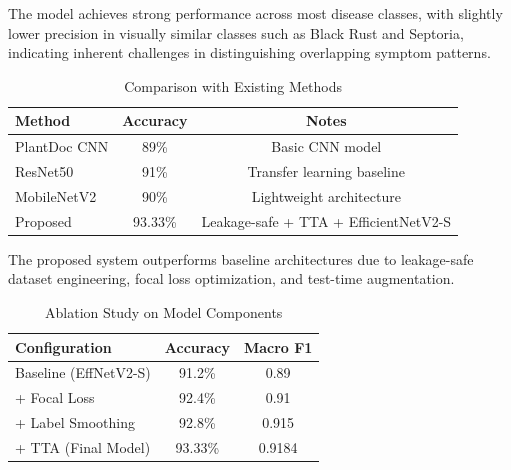 \documentclass[12pt,a4paper]{report}
\begin{document}
\begin{table}[t]
\centering
\caption{Per-Class Performance (Wheat Disease Detection)}
\label{tab:wheat-per-class}
\end{table}

The model achieves strong performance across most disease classes, with slightly lower precision in visually similar classes such as Black Rust and Septoria, indicating inherent challenges in distinguishing overlapping symptom patterns.

\begin{table}[t]
\centering
\caption{Comparison with Existing Methods}
\label{tab:comparison}
\begin{tabular}{lcc}
\hline
Method & Accuracy & Notes \\
\hline
PlantDoc CNN & 89\% & Basic CNN model \\
ResNet50 & 91\% & Transfer learning baseline \\
MobileNetV2 & 90\% & Lightweight architecture \\
Proposed & 93.33\% & Leakage-safe + TTA + EfficientNetV2-S \\
\hline
\end{tabular}
\end{table}

The proposed system outperforms baseline architectures due to leakage-safe dataset engineering, focal loss optimization, and test-time augmentation.

\begin{table}[t]
\centering
\caption{Ablation Study on Model Components}
\label{tab:ablation}
\begin{tabular}{lcc}
\hline
Configuration & Accuracy & Macro F1 \\
\hline
Baseline (EffNetV2-S) & 91.2\% & 0.89 \\
+ Focal Loss & 92.4\% & 0.91 \\
+ Label Smoothing & 92.8\% & 0.915 \\
+ TTA (Final Model) & 93.33\% & 0.9184 \\
\hline
\end{tabular}
\end{table}
\end{document}
